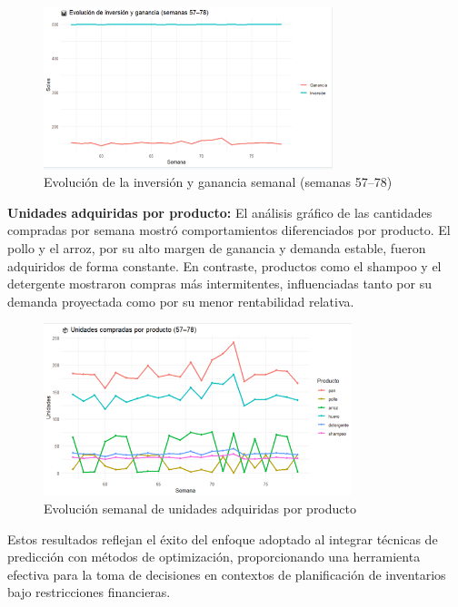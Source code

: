 \documentclass[12pt]{article}
\begin{document}
\begin{figure}[H]
    \centering
    \includegraphics[width=0.75\textwidth]{Imagen3.png}
    \caption{Evolución de la inversión y ganancia semanal (semanas 57–78)}
\end{figure}

\textbf{Unidades adquiridas por producto:} El análisis gráfico de las cantidades compradas por semana mostró comportamientos diferenciados por producto. El pollo y el arroz, por su alto margen de ganancia y demanda estable, fueron adquiridos de forma constante. En contraste, productos como el shampoo y el detergente mostraron compras más intermitentes, influenciadas tanto por su demanda proyectada como por su menor rentabilidad relativa.

\begin{figure}[H]
    \centering
    \includegraphics[width=0.8\textwidth]{uproducto1.png}
    \caption{Evolución semanal de unidades adquiridas por producto}
\end{figure}

Estos resultados reflejan el éxito del enfoque adoptado al integrar técnicas de predicción con métodos de optimización, proporcionando una herramienta efectiva para la toma de decisiones en contextos de planificación de inventarios bajo restricciones financieras.




\end{document}
